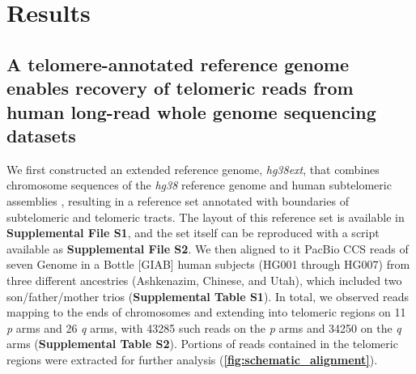 \documentclass{article}
\begin{document}
\section*{Results} 

\subsection*{A telomere-annotated reference genome enables recovery of telomeric reads from human long-read whole genome sequencing datasets}
    We first constructed an extended reference genome, \textit{hg38ext},
        that combines chromosome sequences of the \textit{hg38} reference genome \parencite{grch38,hg38}
            and human subtelomeric assemblies \parencite{riethman2014},
        resulting in a reference set annotated with boundaries of subtelomeric and telomeric tracts.
        The layout of this reference set is available in \textbf{Supplemental File S1},
            and the set itself can be reproduced with a script available as \textbf{Supplemental File S2}.
    We then aligned to it PacBio CCS reads of seven Genome in a Bottle [GIAB] \parencite{giab} human subjects (HG001 through HG007)
        from three different ancestries (Ashkenazim, Chinese, and Utah),
            which included two son/father/mother trios (\textbf{Supplemental Table S1}).
        In total, we observed reads mapping to the ends of chromosomes and extending into telomeric regions
            on 11 \textit{p} arms and 26 \textit{q} arms,
                with 43\textendash{}285 such reads on the \textit{p} arms
                and 34\textendash{}250 on the \textit{q} arms
                    (\textbf{Supplemental Table S2}).
    Portions of reads contained in the telomeric regions were extracted for further analysis (\textbf{\autoref{fig:schematic_alignment}}).
\end{document}

